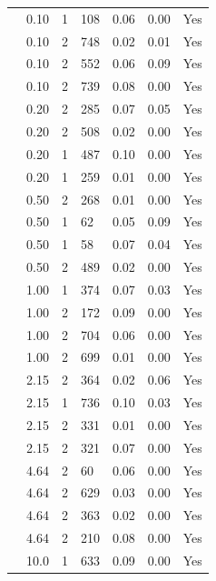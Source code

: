 \begin{longtable}{ | M{2.0cm} | M{2.0cm} | M{1.5cm} | M{1.5cm} | M{2.0cm} | M{2.0cm} | M{1.5cm} | }
                 & 0.10 & 1 & 108 & 0.06 & 0.00 & Yes \\
                 & 0.10 & 2 & 748 & 0.02 & 0.01 & Yes \\
                 & 0.10 & 2 & 552 & 0.06 & 0.09 & Yes \\
                 & 0.10 & 2 & 739 & 0.08 & 0.00 & Yes \\
                 & 0.20 & 2 & 285 & 0.07 & 0.05 & Yes \\
                 & 0.20 & 2 & 508 & 0.02 & 0.00 & Yes \\
                 & 0.20 & 1 & 487 & 0.10 & 0.00 & Yes \\
                 & 0.20 & 1 & 259 & 0.01 & 0.00 & Yes \\
                 & 0.50 & 2 & 268 & 0.01 & 0.00 & Yes \\
                 & 0.50 & 1 & 62  & 0.05 & 0.09 & Yes \\
                 & 0.50 & 1 & 58  & 0.07 & 0.04 & Yes \\
                 & 0.50 & 2 & 489 & 0.02 & 0.00 & Yes \\
                 & 1.00 & 1 & 374 & 0.07 & 0.03 & Yes \\
                 & 1.00 & 2 & 172 & 0.09 & 0.00 & Yes \\
                 & 1.00 & 2 & 704 & 0.06 & 0.00 & Yes \\
                 & 1.00 & 2 & 699 & 0.01 & 0.00 & Yes \\
                 & 2.15 & 2 & 364 & 0.02 & 0.06 & Yes \\
                 & 2.15 & 1 & 736 & 0.10 & 0.03 & Yes \\
                 & 2.15 & 2 & 331 & 0.01 & 0.00 & Yes \\
                 & 2.15 & 2 & 321 & 0.07 & 0.00 & Yes \\
                 & 4.64 & 2 & 60  & 0.06 & 0.00 & Yes \\
                 & 4.64 & 2 & 629 & 0.03 & 0.00 & Yes \\
                 & 4.64 & 2 & 363 & 0.02 & 0.00 & Yes \\
                 & 4.64 & 2 & 210 & 0.08 & 0.00 & Yes \\
                 & 10.0 & 1 & 633 & 0.09 & 0.00 & Yes \\

\end{longtable}
